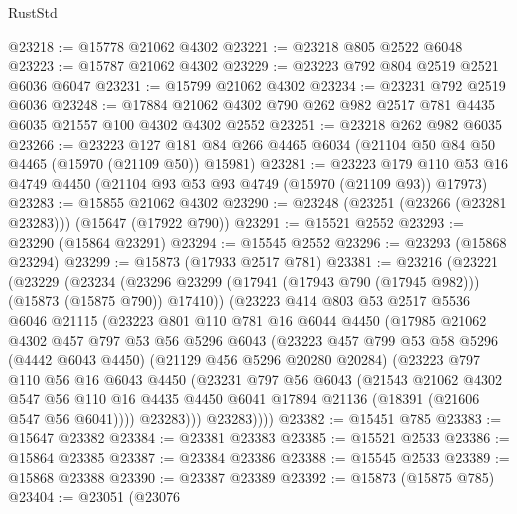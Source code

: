 \begin{lexlean}{RustStd}
\begin{coremodule}
@23218 := @15778 @21062 @4302
@23221 := @23218 @805 @2522 @6048
@23223 := @15787 @21062 @4302
@23229 := @23223 @792 @804 @2519 @2521 @6036 @6047
@23231 := @15799 @21062 @4302
@23234 := @23231 @792 @2519 @6036
@23248 := @17884 @21062 @4302 @790 @262 @982 @2517 @781 @4435 @6035 @21557 @100 @4302 @4302 @2552
@23251 := @23218 @262 @982 @6035
@23266 := @23223
    @127
    @181
    @84
    @266
    @4465
    @6034
    (@21104 @50 @84 @50 @4465 (@15970 (@21109 @50)) @15981)
@23281 := @23223
    @179
    @110
    @53
    @16
    @4749
    @4450
    (@21104 @93 @53 @93 @4749 (@15970 (@21109 @93)) @17973)
@23283 := @15855 @21062 @4302
@23290 := @23248 (@23251 (@23266 (@23281 @23283))) (@15647 (@17922 @790))
@23291 := @15521 @2552
@23293 := @23290 (@15864 @23291)
@23294 := @15545 @2552
@23296 := @23293 (@15868 @23294)
@23299 := @15873 (@17933 @2517 @781)
@23381 := @23216
    (@23221
      (@23229
        (@23234 (@23296 @23299 (@17941 (@17943 @790 (@17945 @982))) (@15873 (@15875 @790)) @17410))
        (@23223
          @414
          @803
          @53
          @2517
          @5536
          @6046
          @21115
          (@23223
            @801
            @110
            @781
            @16
            @6044
            @4450
            (@17985
              @21062
              @4302
              @457
              @797
              @53
              @56
              @5296
              @6043
              (@23223
                @457
                @799
                @53
                @58
                @5296
                (@4442 @6043 @4450)
                (@21129 @456 @5296 @20280 @20284)
                (@23223
                  @797
                  @110
                  @56
                  @16
                  @6043
                  @4450
                  (@23231
                    @797
                    @56
                    @6043
                    (@21543
                      @21062
                      @4302
                      @547
                      @56
                      @110
                      @16
                      @4435
                      @4450
                      @6041
                      @17894
                      @21136
                      (@18391 (@21606 @547 @56 @6041))))
                  @23283)))
            @23283))))
@23382 := @15451 @785
@23383 := @15647 @23382
@23384 := @23381 @23383
@23385 := @15521 @2533
@23386 := @15864 @23385
@23387 := @23384 @23386
@23388 := @15545 @2533
@23389 := @15868 @23388
@23390 := @23387 @23389
@23392 := @15873 (@15875 @785)
@23404 := @23051
    (@23076

\end{coremodule}
\end{lexlean}
